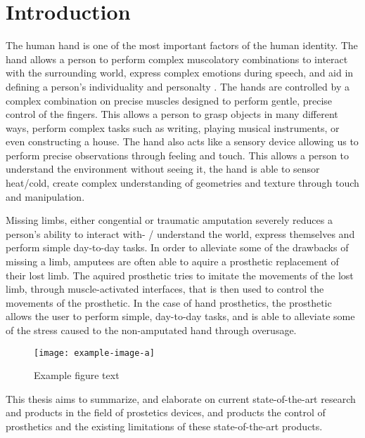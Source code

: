 \documentclass[../main.tex]{subfiles}
\begin{document}
\section{Introduction}

The human hand is one of the most important factors of the human identity.
The hand allows a person  to perform complex muscolatory combinations to interact with the surrounding world, express complex emotions during speech, and aid in defining a person's individuality and personalty \cite{???}.
The hands are controlled by a complex combination on precise muscles designed to perform gentle, precise control of the fingers.
This allows a person to grasp objects in many different ways, perform complex tasks such as writing, playing musical instruments, or even constructing a house.
The hand also acts like a sensory device allowing us to perform precise observations through feeling and touch.
This allows a person to understand the environment without seeing it, the hand is able to sensor heat/cold, create complex understanding of geometries and texture through touch and manipulation.

Missing limbs, either \gls{congential} or \gls{traumatic} amputation severely reduces a person's ability to interact with- / understand the world, express themselves and perform simple day-to-day tasks.
In order to alleviate some of the drawbacks of missing a limb, amputees are often able to aquire a prosthetic replacement of their lost limb.
The aquired prosthetic tries to imitate the movements of the lost limb, through muscle-activated interfaces, that is then used to control the movements of the prosthetic. 
In the case of hand prosthetics, the prosthetic allows the user to perform simple, day-to-day tasks, and is able to alleviate some of the stress caused to the non-amputated hand through overusage.

\begin{figure}[h]
\begin{center}
\texttt{[image: example-image-a]}
\caption{Example figure text}
\label{fig:template}
\end{center}
\end{figure}

This thesis aims to summarize, and elaborate on current state-of-the-art research and products in the field of prostetics devices, and products the control of prosthetics and the existing limitations of these state-of-the-art products. 
\end{document}
